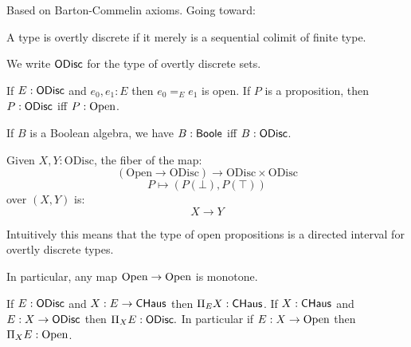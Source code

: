 Based on Barton-Commelin axioms. Going toward:

\begin{definition}
A type is overtly discrete if it merely is a sequential colimit of finite type.
\end{definition}

We write $\mathsf{ODisc}$ for the type of overtly discrete sets.

\begin{proposition}
  If $E:\mathsf{ODisc}$ and $e_0,e_1:E$ then $e_0=_E e_1$ is open. If $P$ is a proposition, then $P:\mathsf{ODisc}$
  iff $P:\mathrm{Open}$.
\end{proposition}

\begin{proposition}
  If $B$ is a Boolean algebra, we have $B:\mathsf{Boole}$ iff $B:\mathsf{ODisc}$.
\end{proposition}

\begin{theorem}
Given $X,Y:\mathrm{ODisc}$, the fiber of the map:
\[ (\mathrm{Open}\to \mathrm{ODisc}) \to \mathrm{ODisc}\times \mathrm{ODisc}\]
\[ P \mapsto (P(\bot),P(\top))\]
over $(X,Y)$ is:
\[X\to Y\]
\end{theorem}

Intuitively this means that the type of open propositions is a directed interval for overtly discrete types.

In particular, any map $\mathrm{Open}\rightarrow\mathrm{Open}$ is monotone.

\begin{theorem}[Tychonoff]
  If $E:\mathsf{ODisc}$ and $X:E\rightarrow\mathsf{CHaus}$ then $\Pi_EX:\mathsf{CHaus}$. If $X:\mathsf{CHaus}$ and $E:X\rightarrow\mathsf{ODisc}$ then
  $\Pi_XE:\mathsf{ODisc}.$ In particular if $E:X\rightarrow\mathrm{Open}$ then $\Pi_XE:\mathrm{Open}$.
\end{theorem}

